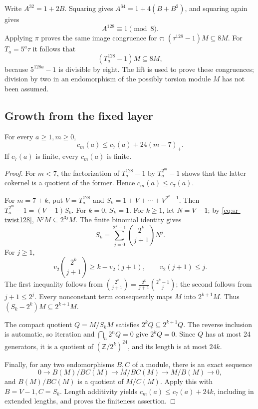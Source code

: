 Write \(A^{32}=1+2B\).
Squaring gives \(A^{64}=1+4(B+B^2)\), and squaring again gives
\begin{equation}\label{eq:sr-A128}
                   A^{128}\equiv1\pmod8.
\end{equation}
Applying \(\pi\) proves the same image congruence for \(\tau\):
\((\tau^{128}-1)M\subseteq8M\).
For \(T_a=5^a\tau\) it follows that
\begin{equation}\label{eq:sr-twist128}
                  (T_a^{128}-1)M\subseteq8M ,
\end{equation}
because \(5^{128a}-1\) is divisible by eight.
The lift is used to prove these congruences; division by two in
an endomorphism of the possibly torsion module \(M\) has not been
assumed.

\subsection{Growth from the fixed layer}
\begin{srproposition}\label{prop:sr-coker-growth}
For every \(a\geq1,m\geq0\),
\[
 c_m(a)\leq c_7(a)+24(m-7)_+ .
\]
If \(c_7(a)\) is finite, every \(c_m(a)\) is finite.
\end{srproposition}
\begin{proof}
For \(m<7\), the factorization of \(T_a^{128}-1\) by
\(T_a^{2^m}-1\) shows that the latter cokernel is a quotient
of the former. Hence \(c_m(a)\leq c_7(a)\).

For \(m=7+k\), put \(V=T_a^{128}\) and
\(S_k=1+V+\cdots+V^{2^k-1}\).
Then \(T_a^{2^m}-1=(V-1)S_k\).
For \(k=0\), \(S_k=1\).
For \(k\geq1\), let \(N=V-1\); by
\eqref{eq:sr-twist128}, \(N^jM\subseteq2^{3j}M\).
The finite binomial identity gives
\[
 S_k=\sum_{j=0}^{2^k-1}{2^k\choose j+1}N^j .
\]
For \(j\geq1\),
\[
 v_2\binom{2^k}{j+1}\geq k-v_2(j+1),\qquad
                       v_2(j+1)\leq j .
\]
The first inequality follows from
\(\binom{2^k}{j+1}=\frac{2^k}{j+1}\binom{2^k-1}{j}\);
the second follows from \(j+1\leq2^j\).
Every nonconstant term consequently maps \(M\) into
\(2^{k+1}M\). Thus
\((S_k-2^k)M\subseteq2^{k+1}M\).

The compact quotient \(Q=M/S_kM\) satisfies
\(2^kQ\subseteq2^{k+1}Q\).
The reverse inclusion is automatic, so iteration and
\(\bigcap_n2^nQ=0\) give \(2^kQ=0\).
Since \(Q\) has at most 24 generators, it is a quotient of
\((\mathbb Z/2^k)^{24}\), and its length is at most \(24k\).

Finally, for any two endomorphisms \(B,C\) of a module, there is an
exact sequence
\[
 0\longrightarrow B(M)/BC(M)
 \longrightarrow M/BC(M)\longrightarrow M/B(M)\longrightarrow0,
\]
and \(B(M)/BC(M)\) is a quotient of \(M/C(M)\).
Apply this with \(B=V-1,C=S_k\).
Length additivity yields \(c_m(a)\leq c_7(a)+24k\),
including in extended lengths, and proves the finiteness assertion.
\end{proof}

